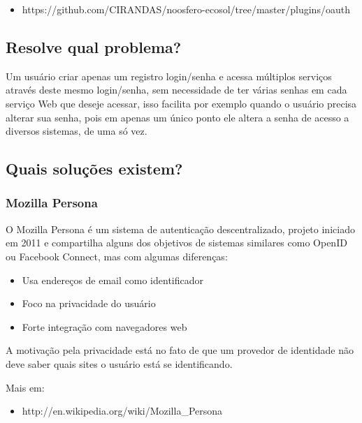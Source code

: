 \documentclass[11pt]{article}
\begin{document}
\begin{itemize}
  \item{https://github.com/CIRANDAS/noosfero-ecosol/tree/master/plugins/oauth}
\end{itemize}

\subsection{Resolve qual problema?}

Um usuário criar apenas um registro login/senha e acessa múltiplos serviços
através deste mesmo login/senha, sem necessidade de ter várias senhas em cada
serviço Web que deseje acessar, isso facilita por exemplo quando o usuário
precisa alterar sua senha, pois em apenas um único ponto ele altera a senha de
acesso a diversos sistemas, de uma só vez.


\subsection{Quais soluções existem?}

\subsubsection{Mozilla Persona}

O Mozilla Persona é um sistema de autenticação descentralizado, projeto
iniciado em 2011 e compartilha alguns dos objetivos de sistemas similares como
OpenID ou Facebook Connect, mas com algumas diferenças:

\begin{itemize}
  \item{Usa endereços de email como identificador}
  \item{Foco na privacidade do usuário}
  \item{Forte integração com navegadores web}
\end{itemize}

A motivação pela privacidade está no fato de que um provedor de identidade não
deve saber quais sites o usuário está se identificando.

Mais em:
\begin{itemize}
  \item{http://en.wikipedia.org/wiki/Mozilla\_Persona}
\end{itemize}
\end{document}
